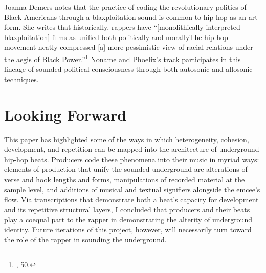Joanna Demers notes that the practice of coding the revolutionary politics of Black Americans through a blaxploitation sound is common to hip-hop as an art form. She writes that historically, rappers have ``[monolithically interpreted blaxploitation] films as unified both politically and morally\textellipsis The hip-hop movement neatly compressed [a] more pessimistic view of racial relations under the aegis of Black Power.''\footnote{\cite{joannademersSampling1970sHipHop2003}, 50.} Noname and Phoelix's track participates in this lineage of sounded political consciousness through both autosonic and allosonic techniques.

\section{Looking Forward}
This paper has highlighted some of the ways in which heterogeneity, cohesion, development, and repetition can be mapped into the architecture of underground hip-hop beats. Producers code these phenomena into their music in myriad ways: elements of production that unify the sounded underground are alterations of verse and hook lengths and forms, manipulations of recorded material at the sample level, and additions of musical and textual signifiers alongside the emcee's flow. Via transcriptions that demonstrate both a beat's capacity for development and its repetitive structural layers, I concluded that producers and their beats play a coequal part to the rapper in demonstrating the alterity of underground identity. Future iterations of this project, however, will necessarily turn toward the role of the rapper in sounding the underground.